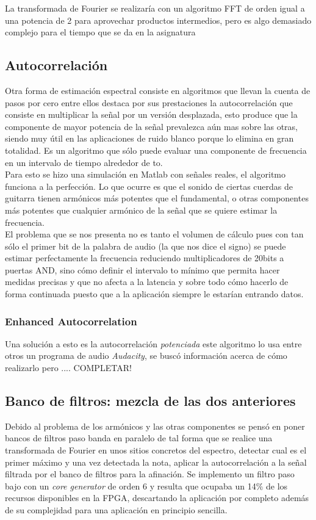	La transformada de Fourier se realizaría con un algoritmo FFT de orden igual a una potencia de 2 para aprovechar productos intermedios, pero es algo demasiado complejo para el tiempo que se da en la asignatura 
	\subsection{Autocorrelación}
	Otra forma de estimación espectral consiste en algoritmos que llevan la cuenta de pasos por cero entre ellos destaca por sus prestaciones la autocorrelación que consiste en multiplicar la señal por un versión desplazada, esto produce que la componente de mayor potencia de la señal prevalezca aún mas sobre las otras, siendo muy útil en las aplicaciones de ruido blanco porque lo elimina en gran totalidad. Es un algoritmo que sólo puede evaluar una componente de frecuencia en un intervalo de tiempo alrededor de to. \\
	Para esto se hizo una simulación en Matlab con señales reales, el algoritmo funciona a la perfección. Lo que ocurre es que el sonido de ciertas cuerdas de guitarra tienen armónicos más potentes que el fundamental, o otras componentes más potentes que cualquier armónico de la señal que se quiere estimar la frecuencia. \\
	El problema que se nos presenta no es tanto el volumen de cálculo pues con tan sólo el primer bit de la palabra de audio (la que nos dice el signo) se puede estimar perfectamente la frecuencia reduciendo multiplicadores de 20bits a puertas AND, sino cómo definir el intervalo to mínimo que permita hacer medidas precisas y que no afecta a la latencia y sobre todo cómo hacerlo de forma continuada puesto que a la aplicación siempre le estarían entrando datos.
	
	
		\subsubsection{Enhanced Autocorrelation}
		Una solución a esto es la autocorrelación \emph{potenciada} este algoritmo lo usa entre otros un programa de audio \emph{Audacity}, se buscó información acerca de cómo realizarlo pero .... \textcolor{rosa}{COMPLETAR!}
	
	\subsection{Banco de filtros: mezcla de las dos anteriores}
	Debido al problema de los armónicos y las otras componentes se pensó en poner bancos de filtros paso banda en paralelo de tal forma que se realice una transformada de Fourier en unos sitios concretos del espectro, detectar cual es el primer máximo y una vez detectada la nota, aplicar la autocorrelación a la señal filtrada por el banco de filtros para la afinación.
	Se implemento un filtro paso bajo con un \emph{core generator} de orden 6 y resulta que ocupaba un 14$\%$ de los recursos disponibles en la FPGA, descartando la aplicación por completo además de su complejidad para una aplicación en principio sencilla.
	



